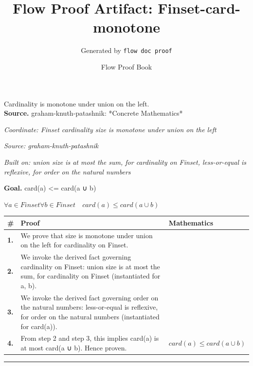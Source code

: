 \documentclass[11pt]{article}
\title{Flow Proof Artifact: Finset-card-monotone}
\author{Generated by \texttt{flow doc proof}}
\date{Flow Proof Book}
\theoremstyle{definition}
\begin{document}
\maketitle
Cardinality is monotone under union on the left.\\[0.5em]
\textbf{Source.} graham-knuth-patashnik: *Concrete Mathematics*\\[0.5em]
\bigskip
{}\par
\smallskip\noindent\textit{Coordinate: Finset \cdot cardinality \cdot size is monotone under union on the left}\par
\smallskip\noindent\textit{Source: graham-knuth-patashnik}\par
\smallskip\noindent\textit{Built on: union size is at most the sum, for cardinality on Finset, less-or-equal is reflexive, for order on the natural numbers}\par
\medskip
\noindent\textbf{Goal.} card(a) <= card(a ∪ b)\par
\noindent$\displaystyle \forall a \in Finset \forall b \in Finset\quad card(a) \le card(a ∪ b)$\par
\medskip
\noindent
\begin{tabular}{@{} >{\raggedright\arraybackslash}p{} >{\raggedright\arraybackslash}p{} >{\raggedleft\arraybackslash}p{} @{}}
\textbf{\#} & \textbf{Proof} & \textbf{Mathematics} \\
\midrule
\textbf{1.} & We prove that size is monotone under union on the left for cardinality on Finset. & \\[0.45em]
\textbf{2.} & We invoke the derived fact governing cardinality on Finset: union size is at most the sum, for cardinality on Finset (instantiated for a, b). & \\[0.45em]
\textbf{3.} & We invoke the derived fact governing order on the natural numbers: less-or-equal is reflexive, for order on the natural numbers (instantiated for card(a)). & \\[0.45em]
\textbf{4.} & From step 2 and step 3, this implies card(a) is at most card(a ∪ b). Hence proven. & $\displaystyle card(a) \le card(a ∪ b)$ \\[0.45em]
\bottomrule
\end{tabular}
\label{thm:Finset-cardinality-size_is_monotone_under_union_on_the_left}
\par\medskip\hrule
\end{document}
